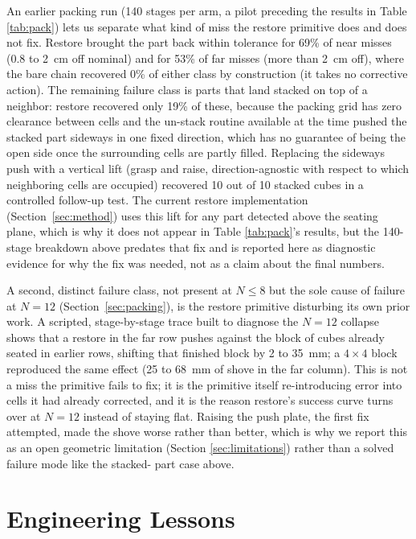 \documentclass[11pt]{article}
\begin{document}
An earlier packing run (140 stages per arm, a pilot preceding the results
in Table \ref{tab:pack}) lets us separate what kind of miss the restore
primitive does and does not fix. Restore brought the part back within
tolerance for 69\% of near misses (0.8 to 2~cm off nominal) and for 53\% of
far misses (more than 2~cm off), where the bare chain recovered 0\% of
either class by construction (it takes no corrective action). The
remaining failure class is parts that land stacked on top of a neighbor:
restore recovered only 19\% of these, because the packing grid has zero
clearance between cells and the un-stack routine available at the time
pushed the stacked part sideways in one fixed direction, which has no
guarantee of being the open side once the surrounding cells are partly
filled. Replacing the sideways push with a vertical lift (grasp and raise,
direction-agnostic with respect to which neighboring cells are occupied)
recovered 10 out of 10 stacked cubes in a controlled follow-up test. The
current restore implementation (Section~\ref{sec:method}) uses this lift
for any part detected above the seating plane, which is why it does not
appear in Table \ref{tab:pack}'s results, but the 140-stage breakdown above
predates that fix and is reported here as diagnostic evidence for why the
fix was needed, not as a claim about the final numbers.

A second, distinct failure class, not present at $N \leq 8$ but the sole
cause of failure at $N=12$ (Section~\ref{sec:packing}), is the restore
primitive disturbing its own prior work. A scripted, stage-by-stage trace
built to diagnose the $N=12$ collapse shows that a restore in the far row
pushes against the block of cubes already seated in earlier rows, shifting
that finished block by 2 to 35~mm; a $4\times4$ block reproduced the same
effect (25 to 68~mm of shove in the far column). This is not a miss the
primitive fails to fix; it is the primitive itself re-introducing error
into cells it had already corrected, and it is the reason restore's success
curve turns over at $N=12$ instead of staying flat. Raising the push plate,
the first fix attempted, made the shove worse rather than better, which is
why we report this as an open geometric limitation (Section
\ref{sec:limitations}) rather than a solved failure mode like the stacked-
part case above.

\section{Engineering Lessons}
\label{sec:lessons}
\end{document}

